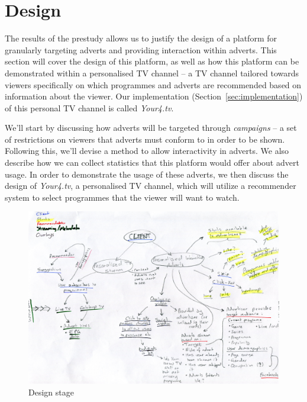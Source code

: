 \section{Design}

The results of the prestudy allows us to justify the design of a platform for granularly targeting adverts and providing interaction within adverts. This section will cover the design of this platform, as well as how this platform can be demonstrated within a personalised TV channel -- a TV channel tailored towards viewers specifically on which programmes and adverts are recommended based on information about the viewer. Our implementation (Section~\ref{sec:implementation}) of this personal TV channel is called \textit{Your4.tv}.

We'll start by discussing how adverts will be targeted through \textit{campaigns} -- a set of restrictions on viewers that adverts must conform to in order to be shown. Following this, we'll devise a method to allow interactivity in adverts. We also describe how we can collect statistics that this platform would offer about advert usage. In order to demonstrate the usage of these adverts, we then discuss the design of \textit{Your4.tv}, a personalised TV channel, which will utilize a recommender system to select programmes that the viewer will want to watch. 

\begin{landscape}
\begin{figure}[th]
	\centering
	\includegraphics[height=\textwidth]{images/design.jpg}
	\caption{Design stage}
\end{figure}
\end{landscape}
\newpage

